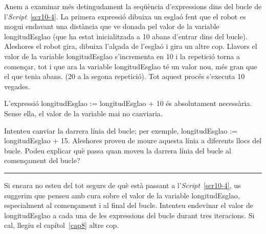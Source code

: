 Anem a examinar més detingudament la seqüència d'expressions dins del bucle de l'\emph{Script}~\ref{scr10-4}. La primera expressió dibuixa un esglaó fent que el robot es mogui endavant una distància que ve donada pel valor de la variable \textsf{longitudEsglao} (que ha estat inicialitzada a 10 abans d'entrar dins del bucle). Aleshores el robot gira, dibuixa l'alçada de l'esglaó i gira un altre cop. Llavors el valor de la variable \textsf{longitudEsglao} s'incrementa en 10 i la repetició torna a començar, tot i que ara la variable \textsf{longitudEsglao} té un valor nou, més gran que el que tenia abans. (20 a la segona repetició). Tot aquest procés s'executa 10 vegades.

L'expressió \textsf{longitudEsglao := longitudEsglao + 10} és absolutament necessària. Sense ella, el valor de la variable mai no canviaria.

\begin{center}
\colorbox{black}{}
\end{center}
{\small
\noindent
Intenteu canviar la darrera línia del bucle; per exemple, \textsf{longitudEsglao := longitudEsglao + 15}. Aleshores proveu de moure aquesta línia a diferents llocs del bucle. Podeu explicar què passa quan moveu la darrera línia del bucle al començament del bucle?}\\
\noindent
\rule{\textwidth}{3pt}
\vspace{1mm}

Si encara no esteu del tot segurs de què està passant a l'\emph{Script}~\ref{scr10-4}, us suggerim que penseu amb cura sobre el valor de la variable \textsf{longitudEsglao}, especialment al començament i al final del bucle. Intenteu endevinar el valor de \textsf{longitudEsglao} a cada una de les expressions del bucle durant tres iteracions. Si cal, llegiu el capítol~\ref{cap8} altre cop.  


